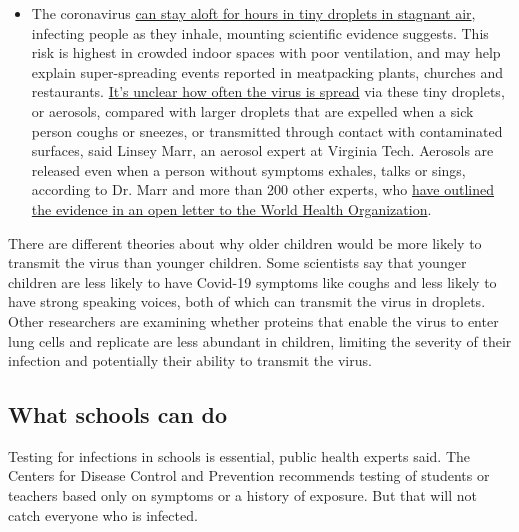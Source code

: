 \begin{itemize}
  \begin{itemize}
  \tightlist
  \item
    The coronavirus
    \href{https://www.nytimes3xbfgragh.onion/2020/07/04/health/239-experts-with-one-big-claim-the-coronavirus-is-airborne.html?action=click\&pgtype=Article\&state=default\&region=MAIN_CONTENT_3\&context=storylines_faq}{can
    stay aloft for hours in tiny droplets in stagnant air}, infecting
    people as they inhale, mounting scientific evidence suggests. This
    risk is highest in crowded indoor spaces with poor ventilation, and
    may help explain super-spreading events reported in meatpacking
    plants, churches and restaurants.
    \href{https://www.nytimes3xbfgragh.onion/2020/07/06/health/coronavirus-airborne-aerosols.html?action=click\&pgtype=Article\&state=default\&region=MAIN_CONTENT_3\&context=storylines_faq}{It's
    unclear how often the virus is spread} via these tiny droplets, or
    aerosols, compared with larger droplets that are expelled when a
    sick person coughs or sneezes, or transmitted through contact with
    contaminated surfaces, said Linsey Marr, an aerosol expert at
    Virginia Tech. Aerosols are released even when a person without
    symptoms exhales, talks or sings, according to Dr. Marr and more
    than 200 other experts, who
    \href{https://academic.oup.com/cid/article/doi/10.1093/cid/ciaa939/5867798}{have
    outlined the evidence in an open letter to the World Health
    Organization}.
  \end{itemize}
\end{itemize}

There are different theories about why older children would be more
likely to transmit the virus than younger children. Some scientists say
that younger children are less likely to have Covid-19 symptoms like
coughs and less likely to have strong speaking voices, both of which can
transmit the virus in droplets. Other researchers are examining whether
proteins that enable the virus to enter lung cells and replicate are
less abundant in children, limiting the severity of their infection and
potentially their ability to transmit the virus.

\hypertarget{what-schools-can-do}{%
\subsection{What schools can do}\label{what-schools-can-do}}

Testing for infections in schools is essential, public health experts
said. The Centers for Disease Control and Prevention recommends testing
of students or teachers based only on symptoms or a history of exposure.
But that will not catch everyone who is infected.

